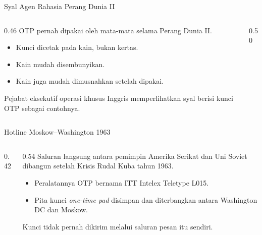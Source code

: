 \documentclass[aspectratio=169,11pt]{beamer}
\begin{document}
\begin{frame}{Syal Agen Rahasia Perang Dunia II}
    \begin{columns}[T,onlytextwidth]
        \begin{column}{0.46\textwidth}
            \footnotesize
            OTP pernah dipakai oleh mata-mata selama Perang Dunia II.
            \begin{itemize}
                \item Kunci dicetak pada kain, bukan kertas.
                \item Kain mudah disembunyikan.
                \item Kain juga mudah dimusnahkan setelah dipakai.
            \end{itemize}
            Pejabat eksekutif operasi khusus Inggris memperlihatkan syal
            berisi kunci OTP sebagai contohnya.
        \end{column}
        \begin{column}{0.50\textwidth}
            \centering
        \end{column}
    \end{columns}
\end{frame}

\begin{frame}{Hotline Moskow--Washington 1963}
    \begin{columns}[T,onlytextwidth]
        \begin{column}{0.42\textwidth}
            \centering
        \end{column}
        \begin{column}{0.54\textwidth}
            \footnotesize
            Saluran langsung antara pemimpin Amerika Serikat dan Uni Soviet
            dibangun setelah Krisis Rudal Kuba tahun 1963.
            \begin{itemize}
                \item Peralatannya OTP bernama ITT Intelex Teletype L015.
                \item Pita kunci \emph{one-time pad} disimpan dan
                      diterbangkan antara Washington DC dan Moskow.
            \end{itemize}
            Kunci tidak pernah dikirim melalui saluran pesan itu sendiri.
        \end{column}
    \end{columns}
\end{frame}
\end{document}
